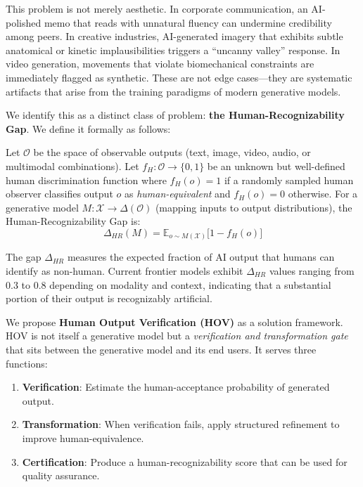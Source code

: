 \documentclass[12pt,oneside]{article}
\newcommand{\E}{\mathbb{E}}
\begin{document}
This problem is not merely aesthetic. In corporate communication, an AI-polished memo that reads with unnatural fluency can undermine credibility among peers. In creative industries, AI-generated imagery that exhibits subtle anatomical or kinetic implausibilities triggers a ``uncanny valley'' response. In video generation, movements that violate biomechanical constraints are immediately flagged as synthetic. These are not edge cases---they are systematic artifacts that arise from the training paradigms of modern generative models.

We identify this as a distinct class of problem: \textbf{the Human-Recognizability Gap}. We define it formally as follows:

\begin{definition}
Let $\mathcal{O}$ be the space of observable outputs (text, image, video, audio, or multimodal combinations). Let $f_H: \mathcal{O} \to \{0, 1\}$ be an unknown but well-defined human discrimination function where $f_H(o) = 1$ if a randomly sampled human observer classifies output $o$ as \textit{human-equivalent} and $f_H(o) = 0$ otherwise. For a generative model $M: \mathcal{X} \to \Delta(\mathcal{O})$ (mapping inputs to output distributions), the Human-Recognizability Gap is:
\begin{equation}
\Delta_{HR}(M) = \E_{o \sim M(\mathcal{X})} \big[1 - f_H(o)\big]
\end{equation}
\end{definition}

The gap $\Delta_{HR}$ measures the expected fraction of AI output that humans can identify as non-human. Current frontier models exhibit $\Delta_{HR}$ values ranging from 0.3 to 0.8 depending on modality and context, indicating that a substantial portion of their output is recognizably artificial.

We propose \textbf{Human Output Verification (HOV)} as a solution framework. HOV is not itself a generative model but a \textit{verification and transformation gate} that sits between the generative model and its end users. It serves three functions:
\begin{enumerate}[noitemsep,topsep=0.5em]
    \item \textbf{Verification}: Estimate the human-acceptance probability of generated output.
    \item \textbf{Transformation}: When verification fails, apply structured refinement to improve human-equivalence.
    \item \textbf{Certification}: Produce a human-recognizability score that can be used for quality assurance.
\end{enumerate}
\end{document}
